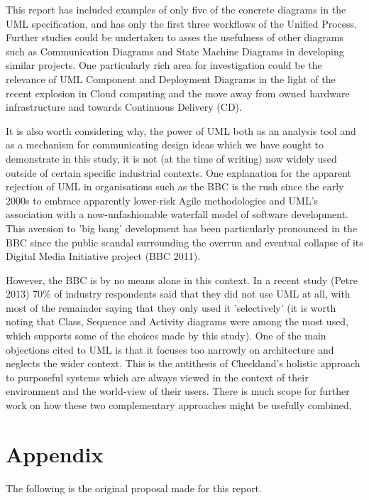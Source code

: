 \documentclass{article}
\begin{document}
This report has included examples of only five of the concrete diagrams in the UML specification, and has only the first three workflows of the Unified Process. Further studies could be undertaken to asses the usefulness of other diagrams such as Communication Diagrams and State Machine Diagrams in developing similar projects. One particularly rich area for investigation could be the relevance of UML Component and Deployment Diagrams in the light of the recent explosion in Cloud computing and the move away from owned hardware infrastructure and towards Continuous Delivery (CD).

It is also worth considering why, the power of UML both as an analysis tool and as a mechanism for communicating design ideas which we have sought to demonstrate in this study, it is not (at the time of writing) now widely used outside of certain specific industrial contexts. One explanation for the apparent rejection of UML in organisations such as the BBC is the rush since the early 2000s to embrace apparently lower-risk Agile methodologies and UML's association with a now-unfashionable waterfall model of software development. This aversion to 'big bang' development has been particularly pronounced in the BBC since the public scandal surrounding the overrun and eventual collapse of its Digital Media Initiative project (BBC 2011).

However, the BBC is by no means alone in this context. In a recent study (Petre 2013) 70\% of industry respondents said that they did not use UML at all, with most of the remainder saying that they only used it 'selectively' (it is worth noting that Class, Sequence and Activity diagrams were among the most used, which supports some of the choices made by this study). One of the main objections cited to UML is that it focuses too narrowly on architecture and neglects the wider context. This is the antithesis of Checkland's holistic approach to purposeful systems which are always viewed in the context of their environment and the world-view of their users. There is much scope for further work on how these two complementary approaches might be usefully combined.


\section{Appendix}

The following is the original proposal made for this report.
\end{document}

